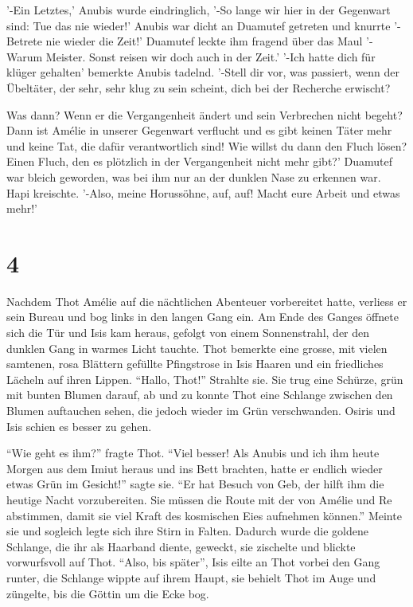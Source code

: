 \documentclass[11pt,titlepage,a5paper]{book}
\begin{document}
'-Ein Letztes,' Anubis wurde eindringlich, '-So lange wir hier in der Gegenwart sind: Tue das nie wieder!' Anubis war dicht an Duamutef getreten und knurrte '-Betrete nie wieder die Zeit!' Duamutef leckte ihm fragend über das Maul '-Warum Meister. Sonst reisen wir doch auch in der Zeit.' '-Ich hatte dich für klüger gehalten' bemerkte Anubis tadelnd. '-Stell dir vor, was passiert, wenn der Übeltäter, der sehr, sehr klug zu sein scheint, dich bei der Recherche erwischt? 

Was dann? Wenn er die Vergangenheit ändert und sein Verbrechen nicht begeht? Dann ist Amélie in unserer Gegenwart verflucht und es gibt keinen Täter mehr und keine Tat, die dafür verantwortlich sind! Wie willst du dann den Fluch lösen? Einen Fluch, den es plötzlich in der Vergangenheit nicht mehr gibt?' Duamutef war bleich geworden, was bei ihm nur an der dunklen Nase zu erkennen war. Hapi kreischte. '-Also, meine Horussöhne, auf, auf! Macht eure Arbeit und etwas mehr!'

\section*{4}

Nachdem Thot Amélie auf die nächtlichen Abenteuer vorbereitet hatte, verliess er sein Bureau und bog links in den langen Gang ein. Am Ende des Ganges öffnete sich die Tür und Isis kam heraus, gefolgt von einem Sonnenstrahl, der den dunklen Gang in warmes Licht tauchte. Thot bemerkte eine grosse, mit vielen samtenen, rosa Blättern gefüllte Pfingstrose in Isis Haaren und ein friedliches Lächeln auf ihren Lippen. "`Hallo, Thot!"' Strahlte sie. Sie trug eine Schürze, grün mit bunten Blumen darauf, ab und zu konnte Thot eine Schlange zwischen den Blumen auftauchen sehen, die jedoch wieder im Grün verschwanden. Osiris und Isis schien es besser zu gehen.

"`Wie geht es ihm?"' fragte Thot. "`Viel besser! Als Anubis und ich ihm heute Morgen aus dem Imiut heraus und ins Bett brachten, hatte er endlich wieder etwas Grün im Gesicht!"' sagte sie. "`Er hat Besuch von Geb, der hilft ihm die heutige Nacht vorzubereiten. Sie müssen die Route mit der von Amélie und Re abstimmen, damit sie viel Kraft des kosmischen Eies aufnehmen können."' Meinte sie und sogleich legte sich ihre Stirn in Falten. Dadurch wurde die goldene Schlange, die ihr als Haarband diente, geweckt, sie zischelte und blickte vorwurfsvoll auf Thot. "`Also, bis später"', Isis eilte an Thot vorbei den Gang runter, die Schlange wippte auf ihrem Haupt, sie behielt Thot im Auge und züngelte, bis die Göttin um die Ecke bog.
\end{document}
